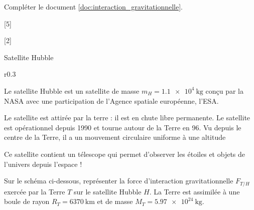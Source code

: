 \numeroQuestion Compléter le document \ref{doc:interaction_gravitationnelle}.


[5]

[2]


\begin{doc}{Satellite Hubble}
  \begin{wrapfigure}{r}{0.3\linewidth}
    \vspace*{-24pt}
    \centering
  \end{wrapfigure}
  
  Le satellite Hubble est un satellite de masse $m_H = \qty{1,1e4}{\kg}$ conçu par la NASA avec une  participation de l'Agence spatiale européenne, l'ESA.
  
  Le satellite est attirée par la terre : il est en chute libre permanente.
  Le satellite est opérationnel depuis 1990 et tourne autour de la Terre en \qty{96}{\min}.
  Vu depuis le centre de la Terre, il a un mouvement circulaire uniforme à une altitude 
  
  Ce satellite contient un télescope qui permet d’observer les étoiles et objets de l’univers depuis l’espace !
\end{doc}

\schematisation
Sur le schéma ci-dessous, représenter la force d’interaction gravitationnelle $F_{T/H}$ exercée par la Terre $T$ sur le satellite Hubble $H$.
La Terre est assimilée à une boule de rayon $R_T = \qty{6370}{\km}$ et de masse $M_T = \qty{5,97e24}{\kg}$.
\smallskip

\smallskip

